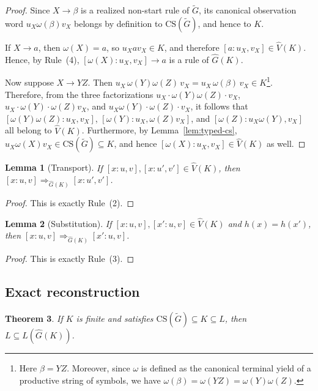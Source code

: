 \documentclass[11pt,a4paper]{article}
\newtheorem{theorem}{Theorem}[section]
\newtheorem{lemma}[theorem]{Lemma}
\newcommand{\CS}{\mathrm{CS}}
\begin{document}
\begin{proof}
Since $X\to\beta$ is a realized non-start rule of $\widetilde G$, its canonical observation word $u_X\omega(\beta)v_X$ belongs by definition to $\CS(\widetilde G)$, and hence to $K$.

If $X\to a$, then $\omega(X)=a$, so $u_Xav_X\in K$, and therefore $[a:u_X,v_X]\in\hat V(K)$. Hence, by Rule~\textup{(4)}, $[\omega(X):u_X,v_X]\to a$ is a rule of $\hat G(K)$.

Now suppose $X\to YZ$. Then
$u_X\,\omega(Y)\omega(Z)\,v_X=u_X\,\omega(\beta)\,v_X\in K$\footnote{Here $\beta=YZ$. Moreover, since $\omega$ is defined as the canonical terminal yield of a productive string of symbols, we have $\omega(\beta)=\omega(YZ)=\omega(Y)\omega(Z)$.}.
Therefore, from the three factorizations
$u_X\cdot\omega(Y)\omega(Z)\cdot v_X$,
$u_X\cdot\omega(Y)\cdot\omega(Z)v_X$,
and
$u_X\omega(Y)\cdot\omega(Z)\cdot v_X$,
it follows that
$[\omega(Y)\omega(Z):u_X,v_X]$,
$[\omega(Y):u_X,\omega(Z)v_X]$,
and
$[\omega(Z):u_X\omega(Y),v_X]$
all belong to $\hat V(K)$.
Furthermore, by Lemma~\ref{lem:typed-cs},
$u_X\omega(X)v_X\in\CS(\widetilde G)\subseteq K$,
and hence
$[\omega(X):u_X,v_X]\in\hat V(K)$
as well.
\end{proof}

\begin{lemma}[Transport]
\label{lem:transport}
If $[x:u,v],[x:u',v']\in\hat V(K)$, then $[x:u,v]\Rightarrow_{\hat G(K)}[x:u',v']$.
\end{lemma}

\begin{proof}
This is exactly Rule~\textup{(2)}.
\end{proof}

\begin{lemma}[Substitution]
\label{lem:substitution}
If $[x:u,v],[x':u,v]\in\hat V(K)$ and $h(x)=h(x')$, then $[x:u,v]\Rightarrow_{\hat G(K)}[x':u,v]$.
\end{lemma}

\begin{proof}
This is exactly Rule~\textup{(3)}.
\end{proof}

\subsection{Exact reconstruction}

\begin{theorem}
\label{thm:complete}
If $K$ is finite and satisfies $\CS(\widetilde G)\subseteq K\subseteq L$, then $L\subseteq L(\hat G(K))$.
\end{theorem}
\end{document}

